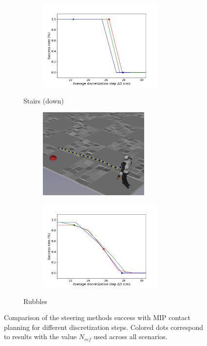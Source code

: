 \begin{figure}[h!]
\begin{subfigure}{0.9\linewidth}
\begin{subfigure}{0.48\linewidth}
        \end{subfigure}
        \begin{subfigure}{0.48\linewidth}
            \includegraphics[trim={0cm 0cm 2cm 1.8cm}, clip,width=\textwidth,height=4.5cm]{Figures/Chapter_MIP_SL1M/res_mip/MIP_stairs/FIGURE_MIP_STAIRS_DOWN_2.png}
        \end{subfigure}
        \caption{Stairs (down)}
        \label{fig:mip:minimizing_basic:1}
    \end{subfigure}
    \begin{subfigure}{0.9\linewidth}
        \centering
        \begin{subfigure}{0.48\linewidth}
            \includegraphics[trim={0cm 0cm 0cm 0cm},clip,width=\textwidth,height=4.5cm]{Figures/Chapter_MIP_SL1M/res_mip/scenario_rubbles.png}
        \end{subfigure}
        \begin{subfigure}{0.48\linewidth}
            \includegraphics[trim={0cm 0cm 2cm 1.8cm}, clip,width=\textwidth,height=4.5cm]{Figures/Chapter_MIP_SL1M/res_mip/MIP_res_rubbles/FIGURE_MIP_RUBBLES_2.png}
        \end{subfigure}
        \caption{Rubbles}
        \label{fig:mip:minimizing_basic:1}
    \end{subfigure}
    \caption{Comparison of the steering methods success with MIP contact planning for different discretization steps. Colored dots correspond to results with the value $N_{ref}$ used across all scenarios.}
    \label{fig:mip:minimizing_basic}
\end{figure}
